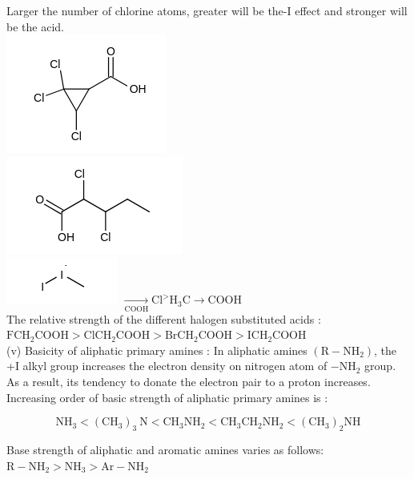 \documentclass[10pt]{article}
\begin{document}
Larger the number of chlorine atoms, greater will be the-I effect and stronger will be the acid.\\
\includegraphics{smile-1c42cfd2432c3abdd73c76b7e8e7f90d3d8ae1d4}\\
\includegraphics{smile-96c0b5bb98cb9a98793536e97d83b16dff05ea25}\\
\includegraphics{smile-048f3fd3b4094537655361377693bfff8f0b2877} $\xrightarrow[\mathrm{COOH}]{ } \mathrm{Cl}^{>} \mathrm{H}_{3} \mathrm{C} \rightarrow \mathrm{COOH}$\\
The relative strength of the different halogen substituted acids :\\
$\mathrm{FCH}_{2} \mathrm{COOH}>\mathrm{ClCH}_{2} \mathrm{COOH}>\mathrm{BrCH}_{2} \mathrm{COOH}>\mathrm{ICH}_{2} \mathrm{COOH}$\\
(v) Basicity of aliphatic primary amines : In aliphatic amines $\left(\mathrm{R}-\mathrm{NH}_{2}\right)$, the +I alkyl group increases the electron density on nitrogen atom of $-\mathrm{NH}_{2}$ group. As a result, its tendency to donate the electron pair to a proton increases.\\
Increasing order of basic strength of aliphatic primary amines is :

$$
\mathrm{NH}_{3}<\left(\mathrm{CH}_{3}\right)_{3} \mathrm{~N}<\mathrm{CH}_{3} \mathrm{NH}_{2}<\mathrm{CH}_{3} \mathrm{CH}_{2} \mathrm{NH}_{2}<\left(\mathrm{CH}_{3}\right)_{2} \mathrm{NH}
$$

Base strength of aliphatic and aromatic amines varies as follows: $\mathrm{R}-\mathrm{NH}_{2}>\mathrm{NH}_{3}>\mathrm{Ar}-\mathrm{NH}_{2}$
\end{document}
